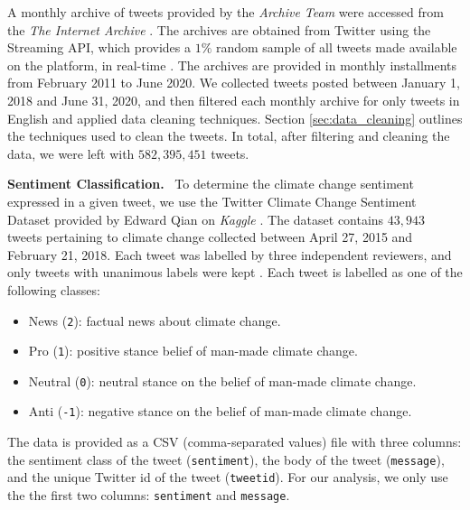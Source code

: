 \documentclass{paper}
\newcommand{\inlineSection}[1]{\vspace{0.5em}\noindent\textbf{#1.}~}
\begin{document}
A monthly archive of tweets provided by the \textit{Archive Team} were accessed from the \textit{The Internet Archive} \cite{data_the_internet_archive}. The archives are obtained from Twitter using the Streaming API, which provides a $1\%$ random sample of all tweets made available on the platform, in real-time \cite{twitter_streaming_api}. The archives are provided in monthly installments from February 2011 to June 2020. We collected tweets posted between January 1, 2018 and June 31, 2020, and then filtered each monthly archive for only tweets in English and applied data cleaning techniques. Section \ref{sec:data_cleaning} outlines the techniques used to clean the tweets. In total, after filtering and cleaning the data, we were left with $582,395,451$ tweets. 

\inlineSection{Sentiment Classification} To determine the climate change sentiment expressed in a given tweet, we use the Twitter Climate Change Sentiment Dataset provided by Edward Qian on \textit{Kaggle} \cite{kaggle:twitter_sentiment_data}. The dataset contains $43,943$ tweets pertaining to climate change collected between April 27, 2015 and February 21, 2018. Each tweet was labelled by three independent reviewers, and only tweets with unanimous labels were kept \cite{kaggle:twitter_sentiment_data}. Each tweet is labelled as one of the following classes:
\begin{itemize}
    \item News (\texttt{2}): factual news about climate change.
    \item Pro (\texttt{1}): positive stance belief of man-made climate change.
    \item Neutral (\texttt{0}): neutral stance on the belief of man-made climate change.
    \item Anti (\texttt{-1}): negative stance on the belief of man-made climate change.
\end{itemize}

The data is provided as a CSV (comma-separated values) file with three columns: the sentiment class of the tweet (\texttt{sentiment}), the body of the tweet (\texttt{message}), and the unique Twitter id of the tweet (\texttt{tweetid}). For our analysis, we only use the the first two columns: \texttt{sentiment} and \texttt{message}.
\end{document}
